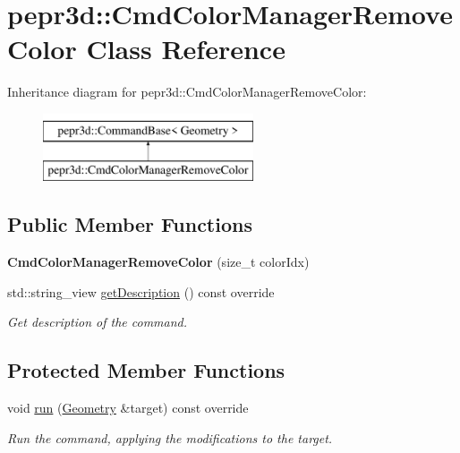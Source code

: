 \hypertarget{classpepr3d_1_1_cmd_color_manager_remove_color}{}\section{pepr3d\+::Cmd\+Color\+Manager\+Remove\+Color Class Reference}
\label{classpepr3d_1_1_cmd_color_manager_remove_color}
Inheritance diagram for pepr3d\+::Cmd\+Color\+Manager\+Remove\+Color\+:\begin{figure}[H]
\begin{center}
\leavevmode
\includegraphics[height=2.000000cm]{classpepr3d_1_1_cmd_color_manager_remove_color}
\end{center}
\end{figure}
\subsection*{Public Member Functions}
\begin{DoxyCompactItemize}
\item 
\mbox{\label{classpepr3d_1_1_cmd_color_manager_remove_color_ac905fef841b2873ee1959e044411e402}} 
{\bfseries Cmd\+Color\+Manager\+Remove\+Color} (size\+\_\+t color\+Idx)
\item 
\mbox{\label{classpepr3d_1_1_cmd_color_manager_remove_color_aa43776157afafd9ae0f31a12927525a6}} 
std\+::string\+\_\+view \mbox{\hyperlink{classpepr3d_1_1_cmd_color_manager_remove_color_aa43776157afafd9ae0f31a12927525a6}{get\+Description}} () const override
\begin{DoxyCompactList}\small\item\em Get description of the command. \end{DoxyCompactList}\end{DoxyCompactItemize}
\subsection*{Protected Member Functions}
\begin{DoxyCompactItemize}
\item 
\mbox{\label{classpepr3d_1_1_cmd_color_manager_remove_color_a6e668863ad50cac553cd0ace8dc9dc1b}} 
void \mbox{\hyperlink{classpepr3d_1_1_cmd_color_manager_remove_color_a6e668863ad50cac553cd0ace8dc9dc1b}{run}} (\mbox{\hyperlink{classpepr3d_1_1_geometry}{Geometry}} \&target) const override
\begin{DoxyCompactList}\small\item\em Run the command, applying the modifications to the target. \end{DoxyCompactList}\end{DoxyCompactItemize}
